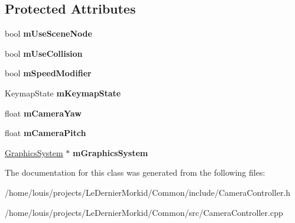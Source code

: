 \subsection*{Protected Attributes}
\begin{DoxyCompactItemize}
\item 
\mbox{\label{class_common_1_1_camera_controller_aa2db4d904aadf4af7f663e6385fa1a7e}} 
bool {\bfseries m\+Use\+Scene\+Node}
\item 
\mbox{\label{class_common_1_1_camera_controller_a074c334b4156cf5b7c334e41b7e34619}} 
bool {\bfseries m\+Use\+Collision}
\item 
\mbox{\label{class_common_1_1_camera_controller_a3652121296a21279131ce9197ea57995}} 
bool {\bfseries m\+Speed\+Modifier}
\item 
\mbox{\label{class_common_1_1_camera_controller_a6de401fd5501b9f48aab9efc11e5da68}} 
Keymap\+State {\bfseries m\+Keymap\+State}
\item 
\mbox{\label{class_common_1_1_camera_controller_af0c031abefd0e2caebdc18795d1953df}} 
float {\bfseries m\+Camera\+Yaw}
\item 
\mbox{\label{class_common_1_1_camera_controller_a53ffb8220c31ac47f8c7c336a4bebe62}} 
float {\bfseries m\+Camera\+Pitch}
\item 
\mbox{\label{class_common_1_1_camera_controller_ae2970e63d46f18b24b8a0ae4b6acf247}} 
\hyperlink{class_common_1_1_graphics_system}{Graphics\+System} $\ast$ {\bfseries m\+Graphics\+System}
\end{DoxyCompactItemize}


The documentation for this class was generated from the following files\+:\begin{DoxyCompactItemize}
\item 
/home/louis/projects/\+Le\+Dernier\+Morkid/\+Common/include/Camera\+Controller.\+h\item 
/home/louis/projects/\+Le\+Dernier\+Morkid/\+Common/src/Camera\+Controller.\+cpp\end{DoxyCompactItemize}
